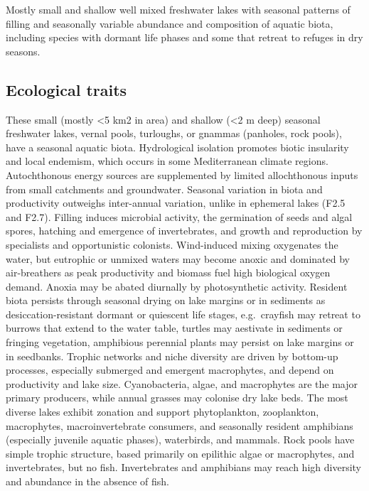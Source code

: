 \documentclass[
  letterpaper,
  DIV=11,
  numbers=noendperiod]{scrartcl}
\begin{document}
Mostly small and shallow well mixed freshwater lakes with seasonal
patterns of filling and seasonally variable abundance and composition of
aquatic biota, including species with dormant life phases and some that
retreat to refuges in dry seasons.

\subsection{Ecological traits}\label{ecological-traits-119}

These small (mostly \textless5 km2 in area) and shallow (\textless2 m
deep) seasonal freshwater lakes, vernal pools, turloughs, or gnammas
(panholes, rock pools), have a seasonal aquatic biota. Hydrological
isolation promotes biotic insularity and local endemism, which occurs in
some Mediterranean climate regions. Autochthonous energy sources are
supplemented by limited allochthonous inputs from small catchments and
groundwater. Seasonal variation in biota and productivity outweighs
inter-annual variation, unlike in ephemeral lakes (F2.5 and F2.7).
Filling induces microbial activity, the germination of seeds and algal
spores, hatching and emergence of invertebrates, and growth and
reproduction by specialists and opportunistic colonists. Wind-induced
mixing oxygenates the water, but eutrophic or unmixed waters may become
anoxic and dominated by air-breathers as peak productivity and biomass
fuel high biological oxygen demand. Anoxia may be abated diurnally by
photosynthetic activity. Resident biota persists through seasonal drying
on lake margins or in sediments as desiccation-resistant dormant or
quiescent life stages, e.g.~crayfish may retreat to burrows that extend
to the water table, turtles may aestivate in sediments or fringing
vegetation, amphibious perennial plants may persist on lake margins or
in seedbanks. Trophic networks and niche diversity are driven by
bottom-up processes, especially submerged and emergent macrophytes, and
depend on productivity and lake size. Cyanobacteria, algae, and
macrophytes are the major primary producers, while annual grasses may
colonise dry lake beds. The most diverse lakes exhibit zonation and
support phytoplankton, zooplankton, macrophytes, macroinvertebrate
consumers, and seasonally resident amphibians (especially juvenile
aquatic phases), waterbirds, and mammals. Rock pools have simple trophic
structure, based primarily on epilithic algae or macrophytes, and
invertebrates, but no fish. Invertebrates and amphibians may reach high
diversity and abundance in the absence of fish.
\end{document}
